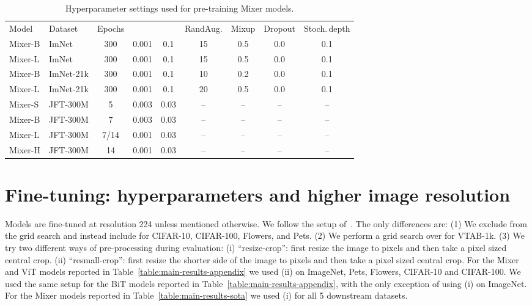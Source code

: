 \documentclass{article}
\newcommand{\name}{Mixer}
\begin{document}
\begin{table}
  \caption{Hyperparameter settings used for pre-training \name{} models.}
  \medskip
  \label{table:reg}
  \centering
  \begin{tabular}{@{}llccccccc@{}}
    \toprule
    Model & Dataset & Epochs &  &  & \hspace{-1ex}RandAug. & Mixup & Dropout & \hspace{-1ex}Stoch.\,depth  \\
    \cmidrule{1-9}
    \name{}-B & ImNet & 300 & 0.001 & 0.1 &  15 & 0.5 & 0.0 & 0.1 \\
    \name{}-L & ImNet & 300 & 0.001 & 0.1 &  15 & 0.5 & 0.0 & 0.1 \\
    \name{}-B & ImNet-21k\hspace{-1ex} & 300 & 0.001 & 0.1 & 10 & 0.2 & 0.0 & 0.1 \\
    \name{}-L & ImNet-21k\hspace{-1ex} & 300 & 0.001 & 0.1 & 20 & 0.5 & 0.0 & 0.1 \\
    \name{}-S& JFT-300M & 5 & 0.003 & 0.03 &  -- & -- & -- & -- \\
    \name{}-B& JFT-300M & 7 & 0.003 & 0.03 &  -- & -- & -- & -- \\
    \name{}-L& JFT-300M & 7/14 & 0.001 & 0.03 &  -- & -- & -- & -- \\
    \name{}-H& JFT-300M & 14 & 0.001 & 0.03 &  -- & -- & -- & -- \\
    \bottomrule
  \end{tabular}
\end{table}

\section{Fine-tuning: hyperparameters and higher image resolution}
Models are fine-tuned at resolution 224 unless mentioned otherwise.
\label{sec:app:fine-tuning}
We follow the setup of~\cite{Dosovitskiy2021}.
The only differences are:
(1) We exclude  from the grid search and instead include  for CIFAR-10, CIFAR-100, Flowers, and Pets.
(2) We perform a grid search over  for VTAB-1k.
(3) We try two different ways of pre-processing during evaluation:
(i) ``resize-crop'': first resize the image to  pixels and then take a  pixel sized central crop.
(ii) ``resmall-crop'': first resize the shorter side of the image to  pixels and then take a  pixel sized central crop.
For the \name{} and ViT models reported in Table~\ref{table:main-results-appendix} we used (ii) on ImageNet, Pets, Flowers, CIFAR-10 and CIFAR-100.
We used the same setup for the BiT models reported in Table~\ref{table:main-results-appendix}, with the only exception of using (i) on ImageNet.
For the \name{} models reported in Table~\ref{table:main-results-sota} we used (i) for all 5 downstream datasets.
\end{document}
